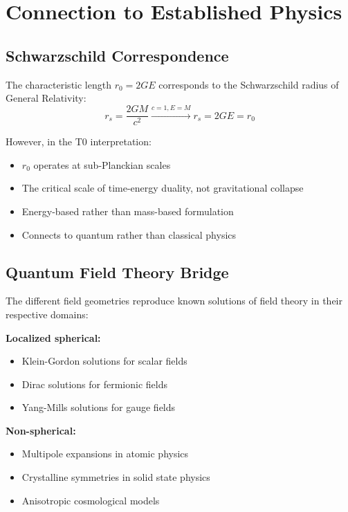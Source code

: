 \documentclass[12pt,a4paper]{report}
\newcommand{\rzero}{r_0}                  %
\begin{document}
\section{Connection to Established Physics}
\label{sec:connection_established}

\subsection{Schwarzschild Correspondence}
\label{subsec:schwarzschild_correspondence}

The characteristic length $\rzero = 2GE$ corresponds to the Schwarzschild radius of General Relativity:
\begin{equation}
	r_s = \frac{2GM}{c^2} \xrightarrow{c=1, E=M} r_s = 2GE = \rzero
\end{equation}

However, in the T0 interpretation:
\begin{itemize}
	\item $\rzero$ operates at sub-Planckian scales
	\item The critical scale of time-energy duality, not gravitational collapse
	\item Energy-based rather than mass-based formulation
	\item Connects to quantum rather than classical physics
\end{itemize}

\subsection{Quantum Field Theory Bridge}
\label{subsec:qft_bridge}

The different field geometries reproduce known solutions of field theory in their respective domains:

\textbf{Localized spherical:} 
\begin{itemize}
	\item Klein-Gordon solutions for scalar fields
	\item Dirac solutions for fermionic fields
	\item Yang-Mills solutions for gauge fields
\end{itemize}

\textbf{Non-spherical:}
\begin{itemize}
	\item Multipole expansions in atomic physics
	\item Crystalline symmetries in solid state physics
	\item Anisotropic cosmological models
\end{itemize}
\end{document}
